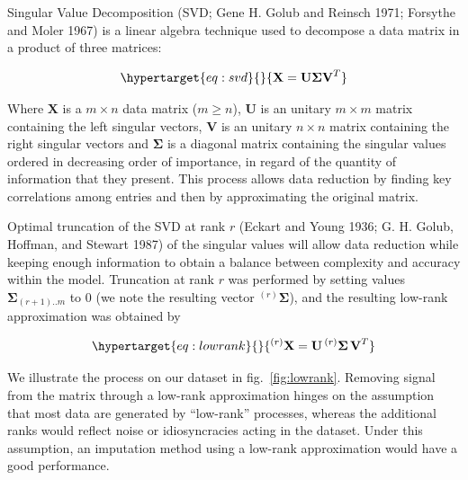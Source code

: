 \documentclass[10pt,oneside]{article}
\begin{document}
Singular Value Decomposition (SVD; Gene H. Golub and Reinsch 1971;
Forsythe and Moler 1967) is a linear algebra technique used to decompose
a data matrix in a product of three matrices:

\begin{equation}\protect\hypertarget{eq:svd}{}{\mathbf{X} =  \mathbf{U \Sigma V}^T}\label{eq:svd}\end{equation}

Where \(\mathbf{X}\) is a \(m \times n\) data matrix (\(m \ge n\)),
\(\mathbf{U}\) is an unitary \(m \times m\) matrix containing the left
singular vectors, \(\mathbf{V}\) is an unitary \(n \times n\) matrix
containing the right singular vectors and \(\mathbf{\Sigma}\) is a
diagonal matrix containing the singular values ordered in decreasing
order of importance, in regard of the quantity of information that they
present. This process allows data reduction by finding key correlations
among entries and then by approximating the original matrix.

Optimal truncation of the SVD at rank \(r\) (Eckart and Young 1936; G.
H. Golub, Hoffman, and Stewart 1987) of the singular values will allow
data reduction while keeping enough information to obtain a balance
between complexity and accuracy within the model. Truncation at rank
\(r\) was performed by setting values \(\mathbf{\Sigma}_{(r+1)..m}\) to
0 (we note the resulting vector \(^{(r)}\mathbf{\Sigma}\)), and the
resulting low-rank approximation was obtained by

\begin{equation}\protect\hypertarget{eq:lowrank}{}{^{(r)}\mathbf{X} =  \mathbf{U} \, ^{(r)}\mathbf{\Sigma \, V}^T}\label{eq:lowrank}\end{equation}

We illustrate the process on our dataset in fig.~\ref{fig:lowrank}.
Removing signal from the matrix through a low-rank approximation hinges
on the assumption that most data are generated by ``low-rank''
processes, whereas the additional ranks would reflect noise or
idiosyncracies acting in the dataset. Under this assumption, an
imputation method using a low-rank approximation would have a good
performance.
\end{document}
